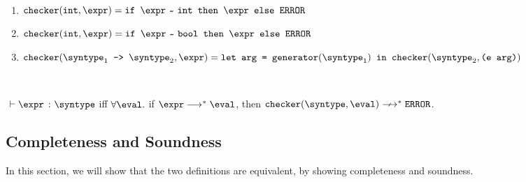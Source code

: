 \begin{definition}
  \label{def_checkCore}
  \ \par
  \begin{enumerate}
      \item $\mkche{\tint}{\expr} = \ife{\matches{\expr}{\tint}}{\expr}{\eerror}$
      \item $\mkche{\tint}{\expr} = \ife{\matches{\expr}{\tbool}}{\expr}{\eerror}$
      \item $\mkche{\mkfun{\syntype_1}{\syntype_2}}{\expr} = \\
       \texttt{let arg = }\mkgen{\syntype_1} \texttt{ in }\mkche{\syntype_2}{\texttt{(e arg)}}$
   \end{enumerate}
\end{definition}

\begin{definition}
  \ \par
  $\ \vdash \hastype{\expr}{\syntype}$ iff $\forall\eval.$ if $\expr \smallsteps[] \eval$, then $\mkche{\syntype}{\eval} \nsmallsteps[] \eerror$.
\end{definition}

\subsection{Completeness and Soundness}

In this section, we will show that the two definitions are equivalent, by showing
completeness and soundness.

